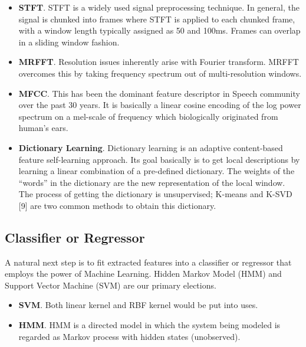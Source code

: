 \documentclass{article} %
\begin{document}
\begin{itemize}
\item \textbf{STFT}. STFT is a widely used signal preprocessing technique. In general, the signal is chunked into frames where STFT is applied to each chunked frame, with a window length typically assigned as 50 and 100ms. Frames can overlap in a sliding window fashion.

\item \textbf{MRFFT}. Resolution issues inherently arise with Fourier transform. MRFFT overcomes this by taking frequency spectrum out of multi-resolution windows.

\item \textbf{MFCC}. This has been the dominant feature descriptor in Speech community over the past 30 years. It is basically a linear cosine encoding of the log power spectrum on a mel-scale of frequency which biologically originated from human's ears. 

\item \textbf{Dictionary Learning}. Dictionary learning is an adaptive content-based feature self-learning approach. Its goal basically is to get local descriptions by learning a linear combination of a pre-defined dictionary. 
The weights of the “words” in the dictionary are the new representation of the local window. The process of getting the dictionary is unsupervised; K-means and K-SVD [9] are two common methods to obtain this dictionary.
\end{itemize}

\subsection{Classifier or Regressor}
A natural next step is to fit extracted features into a classifier or regressor that employs the power of Machine Learning. Hidden Markov Model (HMM) and Support Vector Machine (SVM) are our primary elections.
\begin{itemize}
\item \textbf{SVM}. Both linear kernel and RBF kernel would be put into uses.
\item \textbf{HMM}. HMM is a directed model in which the system being modeled is regarded as Markov process with hidden states (unobserved). 
\end{itemize}
\end{document}
